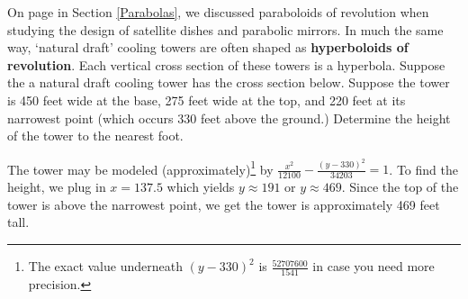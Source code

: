 \documentclass{ximera}
\begin{document}
\begin{problem}
    
On page \pageref{paraboloid} in Section \ref{Parabolas}, we discussed paraboloids of revolution when studying the design of satellite dishes and parabolic mirrors.  In much the same way, `natural draft' cooling towers are often shaped as  \textbf{hyperboloids of revolution}.  Each vertical cross section of these towers is a hyperbola.  Suppose the a natural draft cooling tower has the cross section below. Suppose the tower is 450 feet wide at the base,  275 feet wide at the top, and 220 feet at its narrowest point (which occurs 330 feet above the ground.)  Determine the height of the tower to the nearest foot.
\begin{center}



\end{center} 

\begin{solution}
    
The tower may be modeled (approximately)\footnote{The exact value underneath $(y - 330)^{2}$ is $\frac{52707600}{1541}$ in case you need more precision.} by $\frac{x^2}{12100} - \frac{(y-330)^2}{34203} = 1$.  To find the height, we plug in $x = 137.5$ which yields $y \approx 191$ or $y \approx 469$.  Since the top of the tower is above the narrowest point, we get the tower is approximately 469 feet tall.
\end{solution}

\end{problem}
\end{document}
